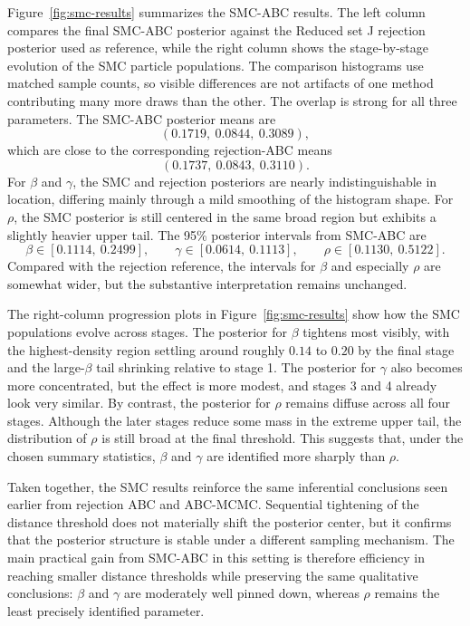 \documentclass[11pt]{article}
\begin{document}
Figure~\ref{fig:smc-results} summarizes the SMC-ABC results. The left column compares the final SMC-ABC posterior against the Reduced set J rejection posterior used as reference, while the right column shows the stage-by-stage evolution of the SMC particle populations. The comparison histograms use matched sample counts, so visible differences are not artifacts of one method contributing many more draws than the other. The overlap is strong for all three parameters. The SMC-ABC posterior means are
\[
(0.1719,\ 0.0844,\ 0.3089),
\]
which are close to the corresponding rejection-ABC means
\[
(0.1737,\ 0.0843,\ 0.3110).
\]
For $\beta$ and $\gamma$, the SMC and rejection posteriors are nearly indistinguishable in location, differing mainly through a mild smoothing of the histogram shape. For $\rho$, the SMC posterior is still centered in the same broad region but exhibits a slightly heavier upper tail. The 95\% posterior intervals from SMC-ABC are
\[
\beta \in [0.1114,\ 0.2499], \qquad
\gamma \in [0.0614,\ 0.1113], \qquad
\rho \in [0.1130,\ 0.5122].
\]
Compared with the rejection reference, the intervals for $\beta$ and especially $\rho$ are somewhat wider, but the substantive interpretation remains unchanged.

The right-column progression plots in Figure~\ref{fig:smc-results} show how the SMC populations evolve across stages. The posterior for $\beta$ tightens most visibly, with the highest-density region settling around roughly $0.14$ to $0.20$ by the final stage and the large-$\beta$ tail shrinking relative to stage 1. The posterior for $\gamma$ also becomes more concentrated, but the effect is more modest, and stages 3 and 4 already look very similar. By contrast, the posterior for $\rho$ remains diffuse across all four stages. Although the later stages reduce some mass in the extreme upper tail, the distribution of $\rho$ is still broad at the final threshold. This suggests that, under the chosen summary statistics, $\beta$ and $\gamma$ are identified more sharply than $\rho$.

Taken together, the SMC results reinforce the same inferential conclusions seen earlier from rejection ABC and ABC-MCMC. Sequential tightening of the distance threshold does not materially shift the posterior center, but it confirms that the posterior structure is stable under a different sampling mechanism. The main practical gain from SMC-ABC in this setting is therefore efficiency in reaching smaller distance thresholds while preserving the same qualitative conclusions: $\beta$ and $\gamma$ are moderately well pinned down, whereas $\rho$ remains the least precisely identified parameter.
\end{document}
